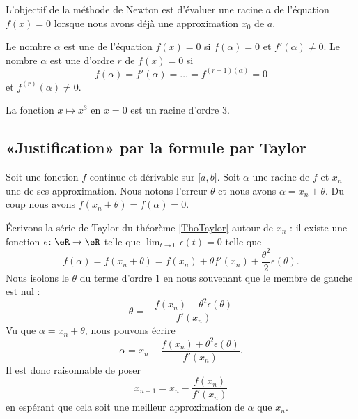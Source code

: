 L'objectif de la méthode de Newton est d'évaluer une racine \( a\) de l'équation \( f(x)=0\) lorsque nous avons déjà une approximation \( x_0\) de \( a\).

\begin{definition}      \label{DEFooXSOQooAnWqKM}
    Le nombre \( \alpha\) est une  de l'équation \( f(x)=0\) si \( f(\alpha)=0\) et \( f'(\alpha)\neq 0\). Le nombre \( \alpha\) est une  d'ordre \( r\) de \( f(x)=0\) si
    \begin{equation}
        f(\alpha)=f'(\alpha)=\ldots=f^{(r-1)(\alpha)}=0
    \end{equation}
    et \( f^{(r)}(\alpha)\neq 0\).
\end{definition}

\begin{example}
    La fonction \( x\mapsto x^3\) en \( x=0\) est un racine d'ordre \( 3\).
\end{example}

\subsection{«Justification» par la formule par Taylor}

    Soit une fonction \( f\) continue et dérivable sur \( \mathopen[ a , b \mathclose]\). Soit \( \alpha\) une racine de \( f\) et \( x_n\) une de ses approximation.  Nous notons l'erreur \( \theta\) et nous avons \( \alpha=x_n+\theta\). Du coup nous avons \( f(x_n+\theta)=f(\alpha)=0\). 

    Écrivons la série de Taylor du théorème \ref{ThoTaylor} autour de \( x_n\) : il existe une fonction \( \epsilon\colon \eR\to \eR\) telle que \( \lim_{t\to 0} \epsilon(t)=0\) telle que
    \begin{equation}        \label{EQooOPUBooYaznay}
        f(\alpha)=f(x_n+\theta)=f(x_n)+\theta f'(x_n)+\frac{ \theta^2 }{ 2 }\epsilon(\theta).
    \end{equation}
    Nous isolons le \( \theta\) du terme d'ordre \( 1\) en nous souvenant que le membre de gauche est nul :
    \begin{equation}
        \theta=-\frac{ f(x_n)-\theta^2\epsilon(\theta) }{ f'(x_n) }
    \end{equation}
    Vu que \( \alpha=x_n+\theta\), nous pouvons écrire
    \begin{equation}
        \alpha=x_n-\frac{ f(x_n)+\theta^2\epsilon(\theta) }{ f'(x_n) }.
    \end{equation}
    Il est donc raisonnable de poser
    \begin{equation}
        x_{n+1}=x_n-\frac{ f(x_n) }{ f'(x_n) }
    \end{equation}
    en espérant que cela soit une meilleur approximation de \( \alpha\) que \( x_n\).

